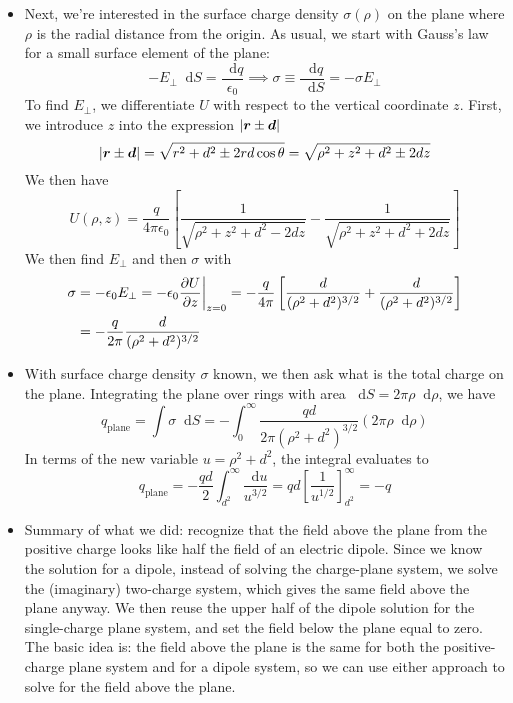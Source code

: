 \documentclass[11pt, a4paper]{article}
\newcommand{\diff}{\mathop{}\!\mathrm{d}} %
\renewcommand{\vec}[1]{\bm{#1}} %
\renewcommand{\r}{\vec{r}}
\newcommand{\e}{\epsilon_{0}} %
\begin{document}
\begin{itemize}
	\item Next, we're interested in the surface charge density $ \sigma(\rho) $ on the plane where $ \rho $ is the radial distance from the origin. As usual, we start with Gauss's law for a small surface element of the plane: 
	\begin{equation*}
		-E_{\perp}\diff S = \frac{\diff q}{\e} \implies \sigma \equiv \frac{\diff q}{\diff S} =  -\sigma E_{\perp}
	\end{equation*}
	To find $ E_{\perp} $, we differentiate $ U $ with respect to the vertical coordinate $ z $. First, we introduce $ z $ into the expression $ \abs{\r \pm \vec{d}} $
	\begin{equation*}
		\abs{\r \pm \vec{d}} = \sqrt{r^{2}+d^{2} \pm 2rd\cos \theta} = \sqrt{\rho^{2} + z^{2} + d^{2} \pm 2dz}
	\end{equation*}
	We then have
	\begin{equation*}
		U(\rho, z) = \frac{q}{4\pi \e}\left[\frac{1}{\sqrt{\rho^{2} + z^{2} + d^{2} - 2dz}} - \frac{1}{\sqrt{\rho^{2} + z^{2} + d^{2} + 2dz}}\right]
	\end{equation*}
	We then find $ E_{\perp} $ and then $ \sigma $ with
	\begin{align*}
		\sigma &= - \e E_{\perp} = -\e \pdv{U}{z}\bigg|_{z=0} = -\frac{q}{4\pi}\left[\frac{d}{(\rho^{2}+d^{2})^{3/2}} +  \frac{d}{(\rho^{2}+d^{2})^{3/2}} \right]\\
		& = -\frac{q}{2\pi} \frac{d}{(\rho^{2}+d^{2})^{3/2}}
	\end{align*}
	
	\item With surface charge density $ \sigma $ known, we then ask what is the total charge on the plane. Integrating the plane over rings with area $ \diff S = 2\pi \rho \diff \rho $, we have
	\begin{equation*}
		q_{\text{plane}} = \int \sigma \diff S = - \int_{0}^{\infty} \frac{qd}{2\pi(\rho^{2}+d^{2})^{3/2}} (2\pi \rho \diff \rho)
	\end{equation*}
	In terms of the new variable $ u = \rho^{2} + d^{2} $, the integral evaluates to
	\begin{equation*}
		q_{\text{plane}} = -\frac{qd}{2}\int_{d^{2}}^{\infty}\frac{\diff u}{u^{3/2}} = qd \left[\frac{1}{u^{1/2}}\right]_{d^{2}}^{\infty} = -q
	\end{equation*}
	
	\item Summary of what we did: recognize that the field above the plane from the positive charge looks like half the field of an electric dipole. Since we know the solution for a dipole, instead of solving the charge-plane system, we solve the (imaginary) two-charge system, which gives the same field above the plane anyway. We then reuse the upper half of the dipole solution for the single-charge plane system, and set the field below the plane equal to zero. The basic idea is: the field above the plane is the same for both the positive-charge plane system and for a dipole system, so we can use either approach to solve for the field above the plane. 
	

\end{itemize}
\end{document}
